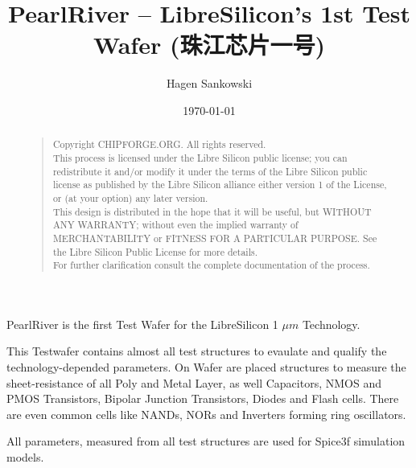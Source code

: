\documentclass[a4paper,english,twoside]{article}
\title{PearlRiver -- LibreSilicon's 1st Test Wafer (珠江芯片一号)}
\author{Hagen Sankowski}
\date{\today}
\begin{document}
\maketitle

\begin{abstract}
\begin{quote}
Copyright  CHIPFORGE.ORG. All rights reserved. \\

This process is licensed under the Libre Silicon public license; you can redistribute it and/or modify it under the terms of the Libre Silicon public license as published by the Libre Silicon alliance either version 1 of the License, or (at your option) any later version. \\

This design is distributed in the hope that it will be useful, but \textsc{WITHOUT ANY WARRANTY}; without even the implied warranty of \textsc{MERCHANTABILITY} or \textsc{FITNESS FOR A PARTICULAR PURPOSE}. See the Libre Silicon Public License for more details. \\

For further clarification consult the complete documentation of the process.
\end{quote}
\end{abstract}
\clearpage


PearlRiver is the first Test Wafer for the LibreSilicon 1 $ \mu m$ Technology.

This Testwafer contains almost all test structures to evaulate and qualify the technology-depended parameters.
On Wafer are placed structures to measure the sheet-resistance of all Poly and Metal Layer, as well Capacitors, NMOS and PMOS Transistors, Bipolar Junction Transistors, Diodes and Flash cells.
There are even common cells like NANDs, NORs and Inverters forming ring oscillators.

All parameters, measured from all test structures are used for Spice3f simulation models.

\clearpage
\tableofcontents
\clearpage

\pagestyle{headings}
\renewcommand{\theequation}{\thesection.\arabic{equation}}





\end{document}
